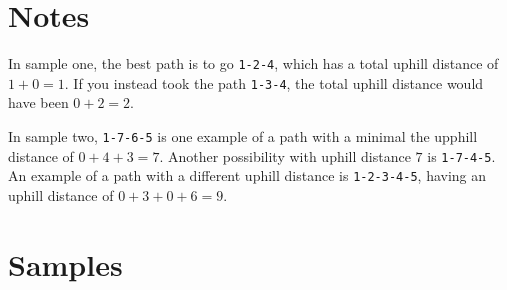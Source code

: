 \section*{Notes}

In sample one, the best path is to go \texttt{1-2-4}, which has a total uphill distance of $1+0=1$.
If you instead took the path \texttt{1-3-4}, the total uphill distance would have been $0+2=2$.

In sample two, \texttt{1-7-6-5} is one example of a path with a minimal the upphill distance of $0+4+3=7$.
Another possibility with uphill distance $7$ is \texttt{1-7-4-5}. An example of a path with a different uphill distance is
\texttt{1-2-3-4-5}, having an uphill distance of $0+3+0+6 = 9$.

\section*{Samples}
